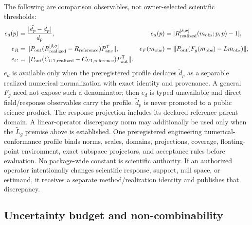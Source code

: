 The following are comparison observables, not owner-selected scientific
thresholds:
\begin{align}
 e_d(p)&=\frac{|\widetilde d_p-d_p|}{d_p}, &
 e_a(p)&=|R_{\rm realized}^{[\delta,\sigma]}(m_{\rm obs};p,p)-1|,\\
 e_R&=\|P_{\rm out}(R_{\rm realized}^{[\delta,\sigma]}-R_{\rm reference})
                 P_{\rm anc}^{\mathsf T}\|, &
 e_F(m_{\rm obs})&=\|P_{\rm out}(F_g(m_{\rm obs})-Lm_{\rm obs})\|,\\
 e_C&=\|P_{\rm out}(C_{U1,{\rm realized}}-C_{U1,{\rm reference}})
                 P_{\rm out}^{\mathsf T}\|.
\end{align}
$e_d$ is available only when the preregistered profile declares
$\widetilde d_p$ as a separable realized numerical normalization with exact
identity and provenance. A general $F_g$ need not expose such a denominator;
then $e_d$ is typed unavailable and direct field/response observables carry the
profile. $\widetilde d_p$ is never promoted to a public science product.
The response projection includes its declared reference-parent domain. A
linear-operator discrepancy norm may additionally be used only when the
$\widetilde L_g$ premise above is established.
One preregistered engineering numerical-conformance profile binds norms,
scales, domains, projections, coverage, floating-point environment, exact
subspace projectors, and acceptance rules before evaluation. No package-wide
constant is scientific authority. If an authorized operator intentionally
changes scientific response, support, null space, or estimand, it receives a
separate method/realization identity and publishes that discrepancy.

\subsection{Uncertainty budget and non-combinability}
\label{sec:uncertainty-budget}

